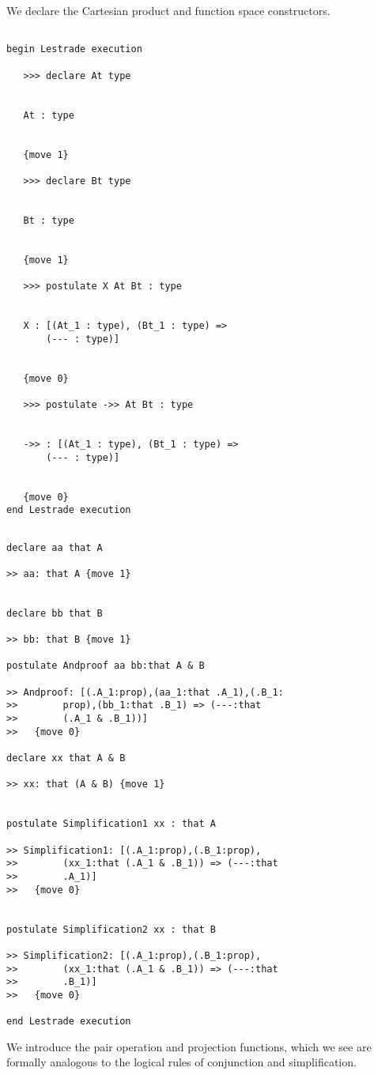 \documentclass[12pt]{article}
\begin{document}
We declare the Cartesian product and function space constructors.

\begin{verbatim}

begin Lestrade execution

   >>> declare At type


   At : type


   {move 1}

   >>> declare Bt type


   Bt : type


   {move 1}

   >>> postulate X At Bt : type


   X : [(At_1 : type), (Bt_1 : type) => 
       (--- : type)]


   {move 0}

   >>> postulate ->> At Bt : type


   ->> : [(At_1 : type), (Bt_1 : type) => 
       (--- : type)]


   {move 0}
end Lestrade execution
\end{verbatim}

  \begin{verbatim}

declare aa that A

>> aa: that A {move 1}


declare bb that B

>> bb: that B {move 1}

postulate Andproof aa bb:that A & B

>> Andproof: [(.A_1:prop),(aa_1:that .A_1),(.B_1:
>>        prop),(bb_1:that .B_1) => (---:that 
>>        (.A_1 & .B_1))]
>>   {move 0}

declare xx that A & B

>> xx: that (A & B) {move 1}


postulate Simplification1 xx : that A

>> Simplification1: [(.A_1:prop),(.B_1:prop),
>>        (xx_1:that (.A_1 & .B_1)) => (---:that 
>>        .A_1)]
>>   {move 0}


postulate Simplification2 xx : that B

>> Simplification2: [(.A_1:prop),(.B_1:prop),
>>        (xx_1:that (.A_1 & .B_1)) => (---:that 
>>        .B_1)]
>>   {move 0}

end Lestrade execution
\end{verbatim}

We introduce the pair operation and projection functions, which we see are formally analogous to the logical rules of conjunction and simplification.
\end{document}
